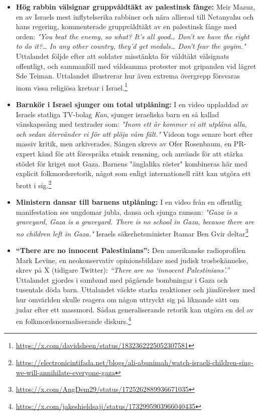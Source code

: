 \begin{itemize}
\item \textbf{Hög rabbin välsignar gruppvåldtäkt av palestinsk fånge:} Meir Mazuz, en av Israels mest inflytelserika rabbiner och nära allierad till Netanyahu och hans regering, kommenterade gruppvåldtäkt av en palestinsk fånge med orden: \textit{"You beat the enemy, so what? It's all good… Don't we have the right to do it?… In any other country, they'd get medals… Don't fear the goyim."} Uttalandet följde efter att soldater misstänkta för våldtäkt välsignats offentligt, och sammanföll med våldsamma protester mot gripanden vid lägret Sde Teiman. Uttalandet illustrerar hur även extrema övergrepp försvaras inom vissa religiösa kretsar i Israel.\footnote{\url{https://x.com/davidsheen/status/1832362225052307581}}

\item \textbf{Barnkör i Israel sjunger om total utplåning:} I en video uppladdad av Israels statliga TV-bolag \textit{Kan}, sjunger israeliska barn en så kallad vänskapssång med textrader som: \textit{"Inom ett år kommer vi att utplåna alla, och sedan återvänder vi för att plöja våra fält."} Videon togs senare bort efter massiv kritik, men arkiverades. Sången skrevs av Ofer Rosenbaum, en PR-expert känd för att förespråka etnisk rensning, och används för att stärka stödet för kriget mot Gaza. Barnens "änglalika röster" kombineras här med explicit folkmordsretorik, något som enligt internationell rätt kan utgöra ett brott i sig.\footnote{\url{https://electronicintifada.net/blogs/ali-abunimah/watch-israeli-children-sing-we-will-annihilate-everyone-gaza}}

\item \textbf{Ministern dansar till barnens utplåning:} I en video från en offentlig manifestation ses ungdomar jubla, dansa och sjunga ramsan: \textit{"Gaza is a graveyard, Gaza is a graveyard. There is no school in Gaza, because there are no children left in Gaza."} Israels säkerhetsminister Itamar Ben Gvir deltar\footnote{\url{https://x.com/AngDem29/status/1725262889936671035}}

\item \textbf{“There are no innocent Palestinians”:} Den amerikanske radioprofilen Mark Levine, en neokonservativ opinionsbildare med judisk trosbekännelse, skrev på X (tidigare Twitter): \textit{“There are no ‘innocent Palestinians’.”} Uttalandet gjordes i samband med pågående bombningar i Gaza och tusentals döda barn. Uttalandet väckte starka reaktioner och jämförelser med hur omvärlden skulle reagera om någon uttryckt sig på liknande sätt om judar efter ett massmord. Sådan generaliserande retorik kan utgöra en del av en folkmordsnormaliserande diskurs.\footnote{\url{https://x.com/jakeshieldsajj/status/1732995903966040435}}


\end{itemize}
